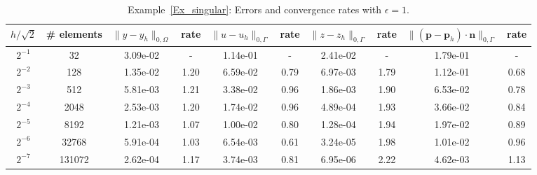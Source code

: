 \documentclass[a4paper,10pt]{article}
\newcommand{\bp}{{\mathbf{p}}}
\numberwithin{theorem}{section}
\begin{document}
\begin{table}[H]
\centering
\caption{Example~\ref{Ex_singular}: Errors and convergence rates with $\epsilon=1$.}
\resizebox{\textwidth}{!}
{%
\begin{tabular}{c |c | c c | c c | c c | c c}
$h/\sqrt{2}$
&\# elements 
& $\|y-y_h\|_{0,\Omega}$ & rate
& $\|u-u_h\|_{0,\Gamma}$ & rate
& $\|z-z_h\|_{0,\Gamma}$ & rate
& $\|(\bp-\bp_h)\cdot \mathbf n\|_{0,\Gamma}$ & rate \\
\hline
$2^{-1}$
&32     
& 3.09e-02 & -    
& 1.14e-01 & -    
& 2.41e-02 & -    
& 1.79e-01 & -    \\

$2^{-2}$
&128    
& 1.35e-02 & 1.20 
& 6.59e-02 & 0.79 
& 6.97e-03 & 1.79 
& 1.12e-01 & 0.68 \\

$2^{-3}$
&512    
& 5.81e-03 & 1.21 
& 3.38e-02 & 0.96 
& 1.86e-03 & 1.90 
& 6.53e-02 & 0.78 \\

$2^{-4}$
&2048   
& 2.53e-03 & 1.20 
& 1.74e-02 & 0.96 
& 4.89e-04 & 1.93 
& 3.66e-02 & 0.84 \\

$2^{-5}$
&8192   
& 1.21e-03 & 1.07 
& 1.00e-02 & 0.80 
& 1.28e-04 & 1.94 
& 1.97e-02 & 0.89 \\

$2^{-6}$
&32768  
& 5.91e-04 & 1.03 
& 6.54e-03 & 0.61 
& 3.24e-05 & 1.98 
& 1.01e-02 & 0.96 \\

$2^{-7}$
&131072 
& 2.62e-04 & 1.17 
& 3.74e-03 & 0.81 
& 6.95e-06 & 2.22 
& 4.62e-03 & 1.13 \\

\hline
\end{tabular}
}
\label{Ex2_combined_table_eps0}
\end{table}
\end{document}
